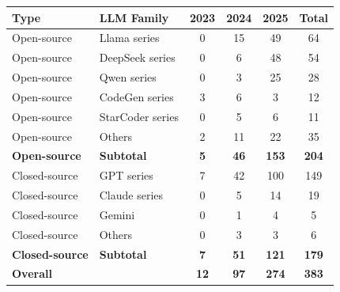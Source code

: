\begin{table}
    \centering
    \small %
    
    
    \begin{tabular}{llcccc}
      \toprule
      \textbf{Type} & \textbf{LLM Family} & \textbf{2023} & \textbf{2024} & \textbf{2025} & \textbf{Total} \\
      \midrule
      Open-source  & Llama series      & 0 & 15 & 49  & 64  \\
      Open-source  & DeepSeek series   & 0 & 6  & 48  & 54  \\
      Open-source  & Qwen series       & 0 & 3  & 25  & 28  \\
      Open-source  & CodeGen series    & 3 & 6  & 3   & 12  \\
      Open-source  & StarCoder series  & 0 & 5  & 6   & 11  \\
      Open-source  & Others            & 2 & 11 & 22  & 35  \\
      \midrule
      \textbf{Open-source} & \textbf{Subtotal} & \textbf{5} & \textbf{46} & \textbf{153} & \textbf{204} \\
      \midrule
      Closed-source & GPT series       & 7 & 42 & 100 & 149 \\
      Closed-source & Claude series    & 0 & 5  & 14  & 19  \\
      Closed-source & Gemini           & 0 & 1  & 4   & 5   \\
      Closed-source & Others           & 0 & 3  & 3   & 6   \\
      \midrule
      \textbf{Closed-source} & \textbf{Subtotal} & \textbf{7} & \textbf{51} & \textbf{121} & \textbf{179} \\
      \midrule
      \multicolumn{2}{l}{\textbf{Overall}} & \textbf{12} & \textbf{97} & \textbf{274} & \textbf{383} \\
      \bottomrule
    \end{tabular}
  \end{table}